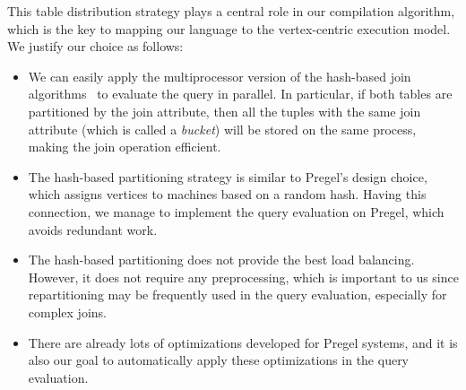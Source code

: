 \documentclass{sokendai_thesis} %
\begin{document}
This table distribution strategy plays a central role in our compilation algorithm, which is the key to mapping our language to the vertex-centric execution model.
We justify our choice as follows:
\begin{itemize}
\item
  We can easily apply the multiprocessor version of the hash-based join algorithms~\cite{hashjoin-mp} to evaluate the query in parallel.
  In particular, if both tables are partitioned by the join attribute, then all the tuples with the same join attribute (which is called a \textit{bucket}) will be stored on the same process, making the join operation efficient.
\item
  The hash-based partitioning strategy is similar to Pregel's design choice, which assigns vertices to machines based on a random hash.
  Having this connection, we manage to implement the query evaluation on Pregel, which avoids redundant work.
\item
  The hash-based partitioning does not provide the best load balancing.
  However, it does not require any preprocessing, which is important to us since repartitioning may be frequently used in the query evaluation, especially for complex joins.
\item
  There are already lots of optimizations developed for Pregel systems, and it is also our goal to automatically apply these optimizations in the query evaluation.
\end{itemize}

\end{document}
